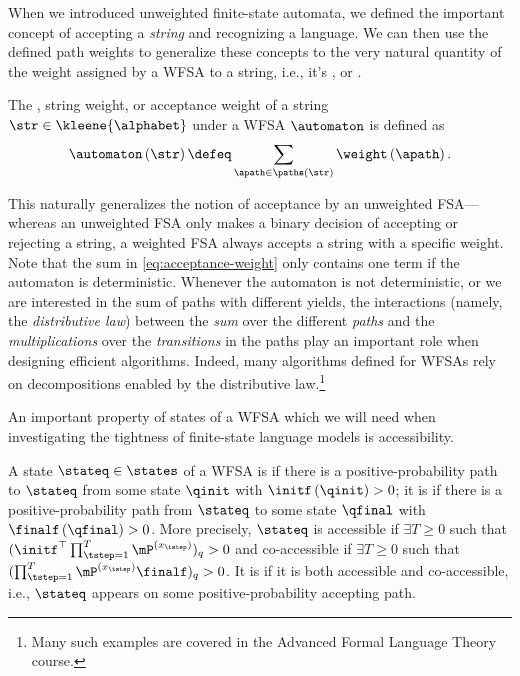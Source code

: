 When we introduced unweighted finite-state automata, we defined the important concept of accepting a \emph{string} and recognizing a language. 
We can then use the defined path weights to generalize these concepts to the very natural quantity of the weight assigned by a WFSA to a string, i.e., it's , or .
\begin{definition}
The , string weight, or acceptance weight of a string $\str \in \kleene{\alphabet}$ under a WFSA $\automaton$ is defined as
\begin{equation} \label{eq:acceptance-weight}
    \automaton \left( \str \right) \defeq \sum_{\apath \in \paths\left( \str \right) }  \weight \left( \apath \right).
\end{equation}
\end{definition}
This naturally generalizes the notion of acceptance by an unweighted FSA---whereas an unweighted FSA only makes a binary decision of accepting or rejecting a string, a weighted FSA always accepts a string with a specific weight.
Note that the sum in \cref{eq:acceptance-weight} only contains one term if the automaton is deterministic.
Whenever the automaton is not deterministic, or we are interested in the sum of paths with different yields, the interactions (namely, the \emph{distributive law}) between the \emph{sum} over the different \emph{paths} and the \emph{multiplications} over the \emph{transitions} in the paths play an important role when designing efficient algorithms.
Indeed, many algorithms defined for WFSAs rely on decompositions enabled by the distributive law.\footnote{Many such examples are covered in the Advanced Formal Language Theory course.}

An important property of states of a WFSA which we will need when investigating the tightness of finite-state language models is accessibility.
\begin{definition} \label{def:acc-co-acc}
A state $\stateq\in \states$ of a WFSA is  if there is a positive-probability path to $\stateq$ from some state $\qinit$ with $\initf\left(\qinit\right)>0$; it is  if there is a positive-probability path from $\stateq$ to some state $\qfinal$ with $\finalf\left(\qfinal\right)>0$.
More precisely, $\stateq$ is accessible if $\exists T\geq 0$ such that $(\initf^{\top} \prod_{\tstep=1}^T \mP^{(x_\tstep)})_q > 0$ and co-accessible if $\exists T\geq 0$ such that $(\prod_{\tstep=1}^T \mP^{(x_\tstep)}\finalf)_q > 0$.
It is  if it is both accessible and co-accessible, i.e., $\stateq$ appears on some positive-probability accepting path.
\end{definition}


